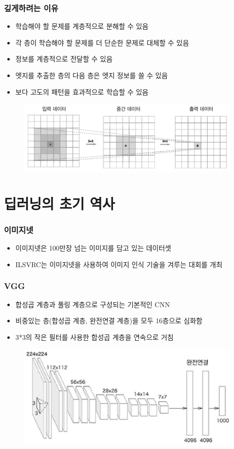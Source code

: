 \documentclass{beamer}
\begin{document}
\begin{frame}
	\frametitle{깊게하려는 이유}
	\begin{itemize}
		\item 학습해야 할 문제를 계층적으로 분해할 수 있음
		\item 각 층이 학습해야 할 문제를 더 단순한 문제로 대체할 수 있음
		\item 정보를 계층적으로 전달할 수 있음
		\item 엣지를 추출한 층의 다음 층은 엣지 정보를 쓸 수 있음
		\item 보다 고도의 패턴을 효과적으로 학습할 수 있음
	\end{itemize}
	\begin{figure}
		\includegraphics[width=1\columnwidth]{Fig_deep/Figure_6.pdf}
	\end{figure}
\end{frame}

\section{딥러닝의 초기 역사}
\begin{frame}
	\frametitle{이미지넷}
	\begin{itemize}
		\item 이미지넷은 100만장 넘는 이미지를 담고 있는 데이터셋
		\item ILSVRC는 이미지넷을 사용하여 이미지 인식 기술을 겨루는 대회를 개최
	\end{itemize}
\end{frame}

\begin{frame}
	\frametitle{VGG}
	\begin{itemize}
		\item 합성곱 계층과 풀링 계층으로 구성되는 기본적인 CNN
		\item 비중있는 층(합성곱 계층, 완전연결 계층)을 모두 16층으로 심화함
		\item 3*3의 작은 필터를 사용한 합성곱 계층을 연속으로 거침
	\end{itemize}
	\begin{figure}
		\includegraphics[width=0.8\columnwidth]{Fig_deep/Figure_7.pdf}
	\end{figure}
\end{frame}
\end{document}

